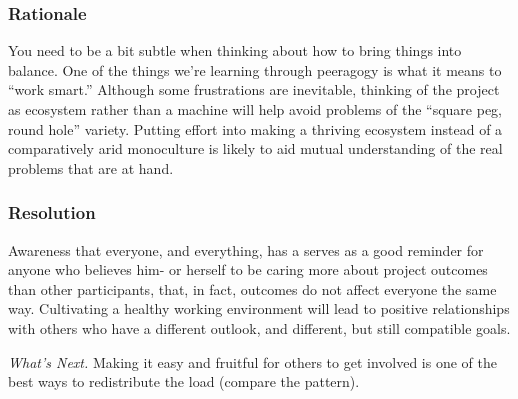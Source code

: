 \subsubsection*{Rationale} You need to be a bit subtle when thinking about how to bring
things into balance.  One of the things we're learning through
peeragogy is what it means to ``work smart.''  Although some frustrations
are inevitable, thinking of the project as ecosystem rather than a
machine will help avoid problems of the ``square peg, round hole''
variety.  Putting effort into making a thriving ecosystem instead of
a comparatively arid monoculture is likely to aid mutual understanding of
the real problems that are at hand.

\subsubsection*{Resolution}
Awareness that everyone, and everything, has a  serves as a good reminder for anyone who believes him- or
herself to be caring more about project outcomes than other
participants, that, in fact, outcomes do not affect everyone the same way.
Cultivating a healthy working environment will lead to positive relationships
with others who have a different outlook, and different, but still compatible goals.

\begin{framed}
\emph{What's Next.}
Making it easy
and fruitful for others to get involved is one of the best ways to
redistribute the load (compare the
pattern).
\end{framed}
\endgroup

    
    
    

    
    
    
    
    
    
    
    
    